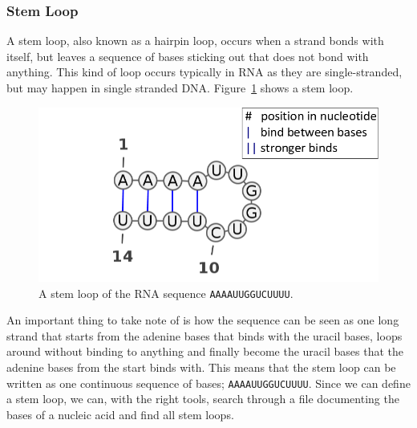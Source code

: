 \subsubsection{Stem Loop}
A stem loop, also known as a hairpin loop, occurs when a strand bonds with 
itself, but leaves a sequence of bases sticking out that does not bond with anything. 
This kind of loop occurs typically in RNA as they are single-stranded, but may 
happen in single stranded DNA. Figure~\ref{fig:stem-loop} 
shows a stem loop.
\begin{figure}[h!]\centering
\includegraphics[scale=0.35]{./lib/stem-loop.png}
\caption{A stem loop of the RNA sequence {\tt AAAAUUGGUCUUUU}.}
\label{fig:stem-loop}
\end{figure} 
An important thing to take note of is how the sequence can be seen as one 
long strand that starts from the adenine bases that binds with the uracil bases, 
loops around without binding to anything and finally become the uracil bases 
that the adenine bases from the start binds with. This means that the 
stem loop can be written as one continuous sequence of bases; {\tt AAAAUUGGUCUUUU}. 
Since we can define a stem loop, we can, with the right tools, search through 
a file documenting the bases of a nucleic acid and find all stem loops.

